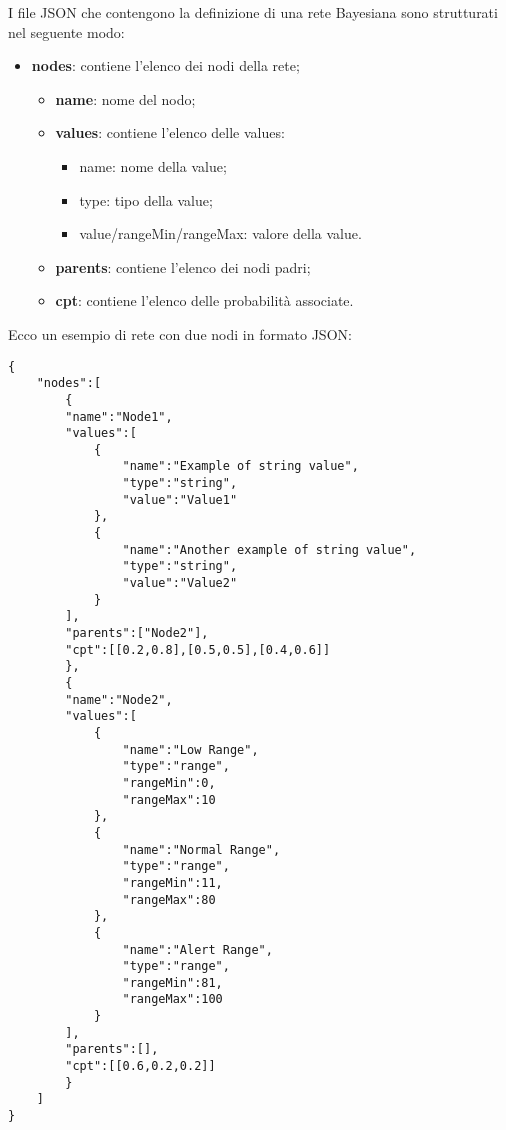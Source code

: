 \pagebreak
{}
I file JSON che contengono la definizione di una rete Bayesiana sono strutturati nel seguente modo:
\begin{itemize}
	\item \textbf{nodes}: contiene l'elenco dei nodi della rete;
	\begin{itemize}
		\item \textbf{name}: nome del nodo;
		\item \textbf{values}: contiene l'elenco delle values:
		\begin{itemize}
			\item name: nome della value;
			\item type: tipo della value;
			\item value/rangeMin/rangeMax: valore della value.
		\end{itemize}
		\item \textbf{parents}: contiene l'elenco dei nodi padri;
		\item \textbf{cpt}: contiene l'elenco delle probabilità associate.
	\end{itemize}
\end{itemize}
\Spazio
Ecco un esempio di rete con due nodi in formato JSON:
\begin{lstlisting}
{
	"nodes":[
		{
		"name":"Node1",
		"values":[
			{
				"name":"Example of string value",
				"type":"string",
				"value":"Value1"
			},
			{
				"name":"Another example of string value",
				"type":"string",
				"value":"Value2"
			}
		],
		"parents":["Node2"],
		"cpt":[[0.2,0.8],[0.5,0.5],[0.4,0.6]]
		},
		{
		"name":"Node2",
		"values":[
			{
				"name":"Low Range",
				"type":"range",
				"rangeMin":0,
				"rangeMax":10
			},
			{
				"name":"Normal Range",
				"type":"range",
				"rangeMin":11,
				"rangeMax":80
			},
			{
				"name":"Alert Range",
				"type":"range",
				"rangeMin":81,
				"rangeMax":100
			}
		],
		"parents":[],
		"cpt":[[0.6,0.2,0.2]]
		}
	]
}
\end{lstlisting}

\pagebreak


